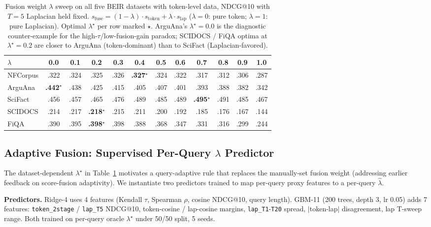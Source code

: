 \documentclass[review,1p]{elsarticle}
\begin{document}
\begin{table}[h]
\centering
\small
\caption{Fusion weight $\lambda$ sweep on all five BEIR datasets with token-level data, NDCG@10 with $T=5$ Laplacian held fixed. $s_{\mathrm{fuse}} = (1-\lambda) \cdot s_{\mathrm{token}} + \lambda \cdot s_{\mathrm{lap}}$ ($\lambda=0$: pure token; $\lambda=1$: pure Laplacian). Optimal $\lambda^\star$ per row marked $\star$. ArguAna's $\lambda^\star = 0.0$ is the diagnostic counter-example for the high-$\tau$/low-fusion-gain paradox; SCIDOCS / FiQA optima at $\lambda^\star = 0.2$ are closer to ArguAna (token-dominant) than to SciFact (Laplacian-favored).}
\label{tab:lambda-sweep}
\begin{tabular}{lccccccccccc}
\toprule
$\lambda$ & 0.0 & 0.1 & 0.2 & 0.3 & 0.4 & 0.5 & 0.6 & 0.7 & 0.8 & 0.9 & 1.0 \\
\midrule
NFCorpus & .322 & .324 & .325 & .326 & \textbf{.327}$^\star$ & .324 & .322 & .317 & .312 & .306 & .287 \\
ArguAna & \textbf{.442}$^\star$ & .438 & .425 & .415 & .405 & .407 & .401 & .393 & .388 & .382 & .342 \\
SciFact & .456 & .457 & .465 & .476 & .489 & .485 & .489 & \textbf{.495}$^\star$ & .491 & .485 & .467 \\
SCIDOCS & .214 & .217 & \textbf{.218}$^\star$ & .215 & .211 & .200 & .192 & .185 & .176 & .167 & .144 \\
FiQA & .390 & .395 & \textbf{.398}$^\star$ & .398 & .388 & .368 & .347 & .331 & .316 & .299 & .244 \\
\bottomrule
\end{tabular}
\end{table}


\subsection{Adaptive Fusion: Supervised Per-Query $\lambda$ Predictor}
\label{subsec:adaptive-lambda}

The dataset-dependent $\lambda^\star$ in Table~\ref{tab:lambda-sweep} motivates a query-adaptive rule that replaces the manually-set fusion weight (addressing earlier feedback on score-fusion adaptivity). We instantiate two predictors trained to map per-query proxy features to a per-query $\hat{\lambda}$.

\textbf{Predictors.} Ridge-4 uses 4 features (Kendall $\tau$, Spearman $\rho$, cosine NDCG@10, query length). GBM-11 (200 trees, depth 3, lr 0.05) adds 7 features: \texttt{token\_2stage} / \texttt{lap\_T5} NDCG@10, token-cosine / lap-cosine margins, \texttt{lap\_T1}-\texttt{T20} spread, $|$token-lap$|$ disagreement, lap T-sweep range. Both trained on per-query oracle $\lambda^\star$ under 50/50 split, 5 seeds.
\end{document}

